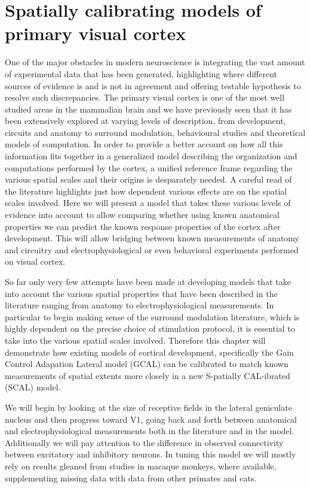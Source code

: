 \chapter{Spatially calibrating models of primary visual cortex}

One of the major obstacles in modern neuroscience is integrating the
vast amount of experimental data that has been generated, highlighting
where different sources of evidence is and is not in agreement and
offering testable hypothesis to resolve such discrepancies. The
primary visual cortex is one of the most well studied areas in the
mammalian brain and we have previously seen that it has been
extensively explored at varying levels of description, from
development, circuits and anatomy to surround modulation, behavioural
studies and theoretical models of computation. In order to provide a
better account on how all this information fits together in a
generalized model describing the organization and computations
performed by the cortex, a unified reference frame regarding the
various spatial scales and their origins is desparately needed. A
careful read of the literature highlights just how dependent various
effects are on the spatial scales involved. Here we will present a
model that takes these various levels of evidence into account to
allow comparing whether using known anatomical properties we can
predict the known response properties of the cortex after
development. This will allow bridging between known measurements of
anatomy and circuitry and electrophysiological or even behavioral
experiments performed on visual cortex.

So far only very few attempts have been made at developing models that
take into account the various spatial properties that have been
described in the literature ranging from anatomy to
electrophysiological measurements. In particular to begin making sense
of the surround modulation literature, which is highly dependent on
the precise choice of stimulation protocol, it is essential to take
into the various spatial scales involved. Therefore this chapter will
demonstrate how existing models of cortical development, specifically
the Gain Control Adapation Lateral model (GCAL) \citep{Stevens2013}
can be calibrated to match known measurements of spatial extents more
closely in a new S-patially CAL-ibrated (SCAL) model.

We will begin by looking at the size of receptive fields in the
lateral geniculate nucleus and then progress toward V1, going back and
forth between anatomical and electrophysiological measurements both in
the literature and in the model. Additionally we will pay attention to
the difference in observed connectivity between excitatory and
inhibitory neurons. In tuning this model we will mostly rely on
results gleaned from studies in macaque monkeys, where available,
supplementing missing data with data from other primates and cats.

